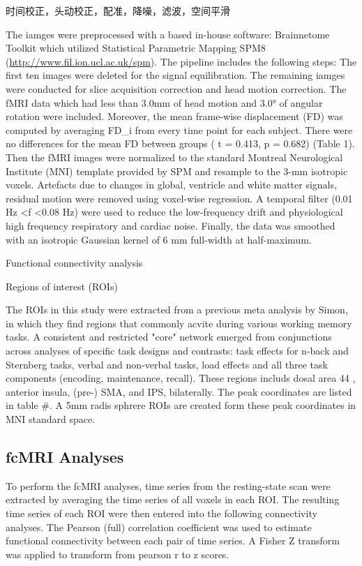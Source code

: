 \documentclass[preprint,authoryear,review,12pt]{elsarticle}
\begin{document}
时间校正，头动校正，配准，降噪，滤波，空间平滑

The iamges were preprocessed with a based in-house software: Brainnetome Toolkit which utilized Statistical Parametric Mapping SPM8 (\url{http://www.fil.ion.ucl.ac.uk/spm}). The pipeline includes the following steps: The first ten images were deleted for the signal equilibration. The remaining iamges were conducted for slice acquisition correction and head motion correction.  The fMRI data which had
less than 3.0mm of head motion and 3.0° of angular rotation were included.  Moreover, the mean frame-wise displacement (FD) was computed by averaging FD\_i from every time point for each subject. There were no differences for the mean FD between groups ( t = 0.413, p = 0.682) (Table 1). Then the fMRI images were normalized to the standard Montreal Neurological Institute (MNI) template provided by SPM and resample to the 3-mm isotropic voxels. Artefacts due to changes in global, ventricle and white matter signals, residual motion were removed using voxel-wise regression. A temporal filter (0.01 Hz \textless f \textless 0.08 Hz) were used to reduce the low-frequency drift and physiological high frequency respiratory and cardiac noise. Finally, the data was smoothed with an isotropic Gaussian kernel of 6 mm full-width at half-maximum. 

Functional connectivity analysis

Regions of interest (ROIs)

The ROIs in this study were extracted from a previous meta analysis by Simon, in which they find regions that commonly acvite during various working memory tasks. A consistent and restricted "core" network emerged from conjunctions across analyses of specific task designs and contrasts: task effects for n-back and Sternberg tasks, verbal and non-verbal tasks, load effects and all three task components (encoding, maintenance, recall). These regions includs dosal area 44 , anterior insula, (pre-) SMA, and IPS, bilaterally. The peak coordinates are listed in table \#. A 5mm radis sphrere ROIs are created form these peak coordinates in MNI standard space.

\subsection*{fcMRI Analyses}

To perform the fcMRI analyses, time series from the resting-state scan were extracted by averaging the time series of all voxels in each ROI. The resulting time series of each ROI were then entered into the following connectivity analyses. The Pearson (full) correlation coefficient was used to estimate functional connectivity between each pair of time series. A Fisher Z transform was applied to transform from pearson r to z scores.
\end{document}
